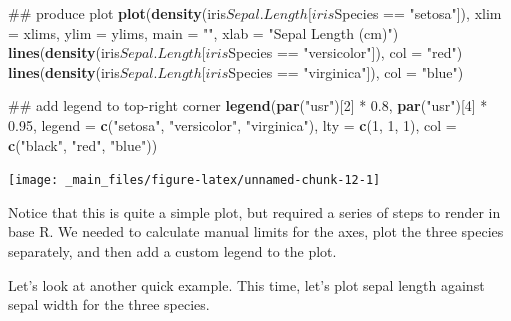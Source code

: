 \documentclass[]{book}
\newenvironment{Shaded}{\begin{snugshade}}{\end{snugshade}}
\newcommand{\KeywordTok}[1]{\textcolor[rgb]{0.13,0.29,0.53}{\textbf{{#1}}}}
\newcommand{\DataTypeTok}[1]{\textcolor[rgb]{0.13,0.29,0.53}{{#1}}}
\newcommand{\DecValTok}[1]{\textcolor[rgb]{0.00,0.00,0.81}{{#1}}}
\newcommand{\FloatTok}[1]{\textcolor[rgb]{0.00,0.00,0.81}{{#1}}}
\newcommand{\StringTok}[1]{\textcolor[rgb]{0.31,0.60,0.02}{{#1}}}
\newcommand{\NormalTok}[1]{{#1}}
\theoremstyle{definition}
\theoremstyle{definition}
\theoremstyle{definition}
\theoremstyle{remark}
\begin{document}
\begin{Shaded}
\begin{Highlighting}[]
\NormalTok{## produce plot}
\KeywordTok{plot}\NormalTok{(}\KeywordTok{density}\NormalTok{(iris$Sepal.Length[iris$Species ==}\StringTok{ "setosa"}\NormalTok{]), }
    \DataTypeTok{xlim =} \NormalTok{xlims, }\DataTypeTok{ylim =} \NormalTok{ylims, }\DataTypeTok{main =} \StringTok{""}\NormalTok{, }\DataTypeTok{xlab =} \StringTok{"Sepal Length (cm)"}\NormalTok{)}
\KeywordTok{lines}\NormalTok{(}\KeywordTok{density}\NormalTok{(iris$Sepal.Length[iris$Species ==}\StringTok{ "versicolor"}\NormalTok{]), }\DataTypeTok{col =} \StringTok{"red"}\NormalTok{)}
\KeywordTok{lines}\NormalTok{(}\KeywordTok{density}\NormalTok{(iris$Sepal.Length[iris$Species ==}\StringTok{ "virginica"}\NormalTok{]), }\DataTypeTok{col =} \StringTok{"blue"}\NormalTok{)}

\NormalTok{## add legend to top-right corner}
\KeywordTok{legend}\NormalTok{(}\KeywordTok{par}\NormalTok{(}\StringTok{"usr"}\NormalTok{)[}\DecValTok{2}\NormalTok{] *}\StringTok{ }\FloatTok{0.8}\NormalTok{, }\KeywordTok{par}\NormalTok{(}\StringTok{"usr"}\NormalTok{)[}\DecValTok{4}\NormalTok{] *}\StringTok{ }\FloatTok{0.95}\NormalTok{, }
       \DataTypeTok{legend =} \KeywordTok{c}\NormalTok{(}\StringTok{"setosa"}\NormalTok{, }\StringTok{"versicolor"}\NormalTok{, }\StringTok{"virginica"}\NormalTok{), }
       \DataTypeTok{lty =} \KeywordTok{c}\NormalTok{(}\DecValTok{1}\NormalTok{, }\DecValTok{1}\NormalTok{, }\DecValTok{1}\NormalTok{), }
       \DataTypeTok{col =} \KeywordTok{c}\NormalTok{(}\StringTok{"black"}\NormalTok{, }\StringTok{"red"}\NormalTok{, }\StringTok{"blue"}\NormalTok{))}
\end{Highlighting}
\end{Shaded}

\begin{center}\texttt{[image: \_main\_files/figure-latex/unnamed-chunk-12-1]} \end{center}

Notice that this is quite a simple plot, but required a series of steps
to render in base R. We needed to calculate manual limits for the axes,
plot the three species separately, and then add a custom legend to the
plot.

Let's look at another quick example. This time, let's plot sepal length
against sepal width for the three species.
\end{document}
